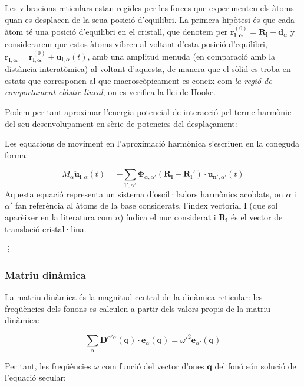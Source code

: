 \documentclass[12pt]{article} %
\let\vec\mathbf %
\begin{document}
{Les vibracions reticulars estan regides per les forces que experimenten els àtoms quan es desplacen de la seua posició d'equilibri. La primera hipòtesi és que cada àtom té una posició d'equilibri en el cristall, que denotem per $\vec r^{(0)}_{\vec l,\vec\alpha}=\vec R_\vec l+\vec d_\alpha$ y considerarem que estos àtoms vibren al voltant d'esta posició d'equilibri, $\vec r_{\vec l,\vec\alpha}=\vec r^{(0)}_{\vec l,\vec\alpha}+\vec u_{\vec l,\alpha}(t)$, amb una amplitud menuda (en comparació amb la distància interatòmica) al voltant d'aquesta,   de manera que el sòlid es troba en estats que corresponen al que macroscòpicament es coneix com \textit{la regió de comportament elàstic lineal}, on es verifica la llei de Hooke.

Podem per tant aproximar l'energia potencial de interacció pel terme harmònic del seu desenvolupament en sèrie de potencies del despla\c{c}ament:

Les equacions de moviment en l'aproximació harmònica s'escriuen en la coneguda forma:

\begin{equation}
 M_\alpha\vec{\ddot{u}}_{\vec l,\alpha}(t)=-\sum_{\vec l',\alpha'}\vec\Phi_{\alpha,\alpha'}\left(\vec R_\vec l-\vec R_\vec l'\right)\cdot\vec u_{\vec n',\alpha'}(t)
\end{equation}
 Aquesta equació representa un sistema  d'oscil·ladors harmònics acoblats, on $\alpha$ i $\alpha'$ fan referència al àtoms de la base considerats, l'índex vectorial $\vec l$ (que sol aparèixer en la literatura com $n$) índica el nuc considerat i $\vec R_\vec l$ és el vector de translació cristal·lina.
 
\vdots 




\subsubsection{Matriu dinàmica}

La matriu dinàmica és la magnitud central de la dinàmica reticular: les freqüències dels fonons es calculen a partir dels valors propis de la matriu dinàmica:

\begin{equation}
\sum_{\alpha}\vec D^{\alpha'\alpha}(\vec q)\cdot\vec e_{\alpha}(\vec q)={\omega'}^{2}\vec e_{\alpha'}(\vec q)
\end{equation}   

Per tant, les freqüències $\omega$ com funció del vector d'ones $\vec q$ del fonó són solució de l'equació secular:

}
\end{document}
